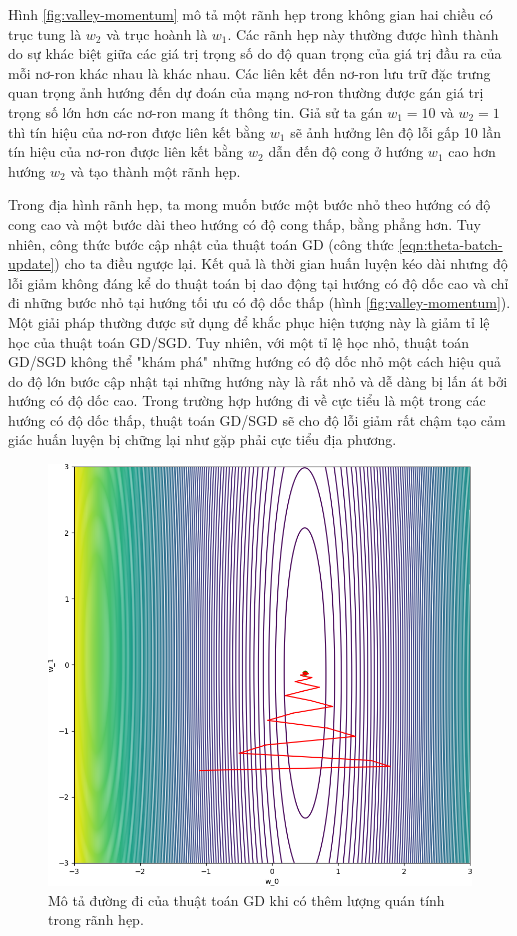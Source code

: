 Hình \ref{fig:valley-momentum} mô tả một rãnh hẹp trong không gian hai chiều có trục tung là $w_2$ và trục hoành là $w_1$. Các rãnh hẹp này thường được hình thành do sự khác biệt giữa các giá trị trọng số do độ quan trọng của giá trị đầu ra của mỗi nơ-ron khác nhau là khác nhau. Các liên kết đến nơ-ron lưu trữ đặc trưng quan trọng ảnh hướng đến dự đoán của mạng nơ-ron thường được gán giá trị trọng số lớn hơn các nơ-ron mang ít thông tin. Giả sử ta gán $w_1 = 10$ và $w_2 = 1$ thì tín hiệu của nơ-ron được liên kết bằng $w_1$ sẽ ảnh hưởng lên độ lỗi gấp 10 lần tín hiệu của nơ-ron được liên kết bằng $w_2$ dẫn đến độ cong ở hướng $w_1$ cao hơn hướng $w_2$ và tạo thành một rãnh hẹp.

Trong địa hình rãnh hẹp, ta mong muốn bước một bước nhỏ theo hướng có độ cong cao và một bước dài theo hướng có độ cong thấp, bằng phẳng hơn. Tuy nhiên, công thức bước cập nhật của thuật toán GD (công thức \ref{eqn:theta-batch-update}) cho ta điều ngược lại. Kết quả là thời gian huấn luyện kéo dài nhưng độ lỗi giảm không đáng kể do thuật toán bị dao động tại hướng có độ dốc cao và chỉ đi những bước nhỏ tại hướng tối ưu có độ dốc thấp (hình \ref{fig:valley-momentum}). Một giải pháp thường được sử dụng để khắc phục hiện tượng này là giảm tỉ lệ học của thuật toán GD/SGD. Tuy nhiên, với một tỉ lệ học nhỏ, thuật toán GD/SGD không thể "khám phá" những hướng có độ dốc nhỏ một cách hiệu quả do độ lớn bước cập nhật tại những hướng này là rất nhỏ và dễ dàng bị lấn át bởi hướng có độ dốc cao. Trong trường hợp hướng đi về cực tiểu là một trong các hướng có độ dốc thấp, thuật toán GD/SGD sẽ cho độ lỗi giảm rất chậm tạo cảm giác huấn luyện bị chững lại như gặp phải cực tiểu địa phương.

\begin{figure}[htp]
	\centering
	\includegraphics[width=85 mm]{images/gdm.png}
	\caption{Mô tả đường đi của thuật toán GD khi có thêm lượng quán tính trong rãnh hẹp.}
	\label{fig:gd-m}
\end{figure}

